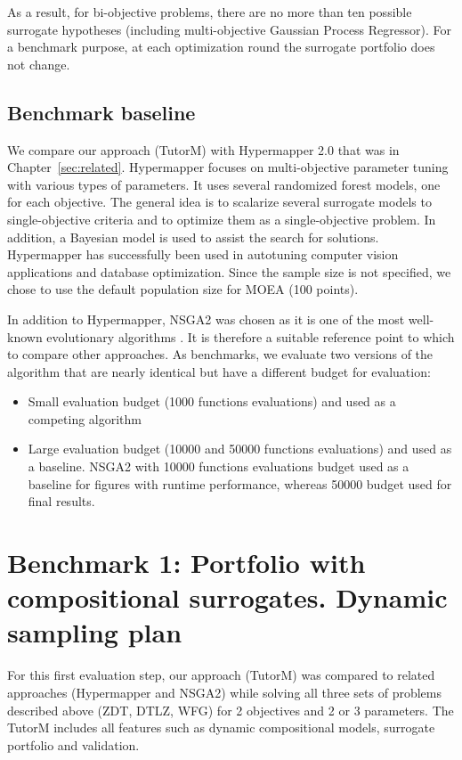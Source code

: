     As a result, for bi-objective problems, there are no more than ten possible surrogate hypotheses (including multi-objective Gaussian Process Regressor). For a benchmark purpose, at each optimization round the surrogate portfolio does not change. 

    \subsection{Benchmark baseline}
    We compare our approach (TutorM) with Hypermapper 2.0\cite{nardi2019practical} that was in Chapter~\ref{sec:related}. Hypermapper focuses on multi-objective parameter tuning with various types of parameters. It uses several randomized forest models, one for each objective. The general idea is to scalarize several surrogate models to single-objective criteria and to optimize them as a single-objective problem. In addition, a Bayesian model is used to assist the search for solutions. Hypermapper has successfully been used in autotuning computer vision applications and database optimization. Since the sample size is not specified, we chose to use the default population size for MOEA (100 points).

    In addition to Hypermapper, NSGA2 was chosen as it is one of the most well-known evolutionary algorithms \cite{RamirezRV19}. It is therefore a suitable reference point to which to compare other approaches. As benchmarks, we evaluate two versions of the algorithm that are nearly identical but have a different budget for evaluation:
        \begin{itemize}
            \item Small evaluation budget (1000 functions evaluations) and used as a competing algorithm
            \item Large evaluation budget (10000 and 50000 functions evaluations) and used as a baseline. NSGA2 with 10000 functions evaluations budget used as a baseline for figures with runtime performance, whereas 50000 budget used for final results.
        \end{itemize}


\section{Benchmark 1: Portfolio with compositional surrogates. Dynamic sampling plan}
    For this first evaluation step, our approach (TutorM) was compared to related approaches (Hypermapper and NSGA2) while solving all three sets of problems described above (ZDT, DTLZ, WFG) for 2 objectives and 2 or 3 parameters. The TutorM includes all features such as dynamic compositional models, surrogate portfolio and validation. 

